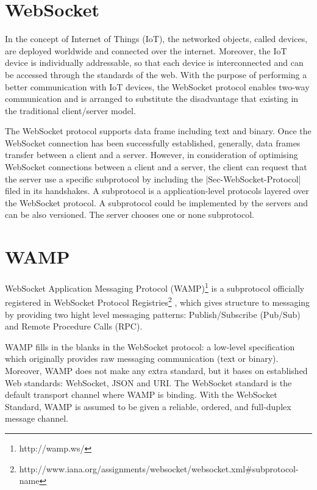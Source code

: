 \section{WebSocket}

In the concept of Internet of Things (IoT), the networked objects, called devices, are deployed worldwide and connected over the internet. Moreover, the IoT device is individually addressable, so that each device is interconnected and can be accessed through the standards of the web. With the purpose of performing a better communication with IoT devices, the WebSocket protocol enables two-way communication and is arranged to substitute the disadvantage that existing in the traditional client/server model.

The WebSocket protocol supports data frame including text and binary. Once the WebSocket connection has been successfully established, generally, data frames transfer between a client and a server. However, in consideration of optimising WebSocket connections between a client and a server, the client can request that the server use a specific subprotocol by including the |Sec-WebSocket-Protocol| filed in its handshakes\cite{rfc64552012web}. A subprotocol is a application-level protocols layered over the WebSocket protocol\cite{rfc64552012web}. A subprotocol could be implemented by the servers and can be also versioned. The server chooses one or none subprotocol. 

\section{WAMP}

WebSocket Application Messaging Protocol (WAMP)\footnote{http://wamp.ws/} is a subprotocol officially registered in WebSocket Protocol Registries\footnote{http://www.iana.org/assignments/websocket/websocket.xml\#subprotocol-name} , which gives structure to messaging by providing two hight level messaging patterns: Publish/Subscribe (Pub/Sub) and Remote Procedure Calls (RPC).

WAMP fills in the blanks in the WebSocket protocol: a low-level specification which originally provides raw messaging communication (text or binary). Moreover, WAMP does not make any extra standard, but it bases on established Web standards: WebSocket, JSON and URI. The WebSocket standard is the default transport channel where WAMP is binding. With the WebSocket Standard, WAMP is assumed to be given a reliable, ordered, and full-duplex message channel. 

